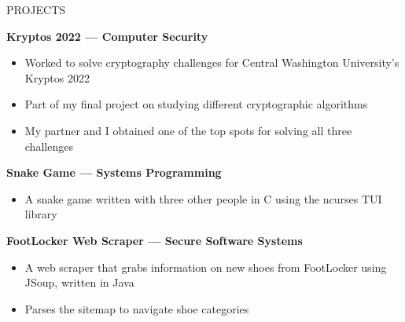 \documentclass{resume}
\begin{document}
\begin{rSection}{PROJECTS}
	\vspace{-1.25em}

	\item \textbf{Kryptos 2022 --- Computer Security} \\
	\vspace{-1.25em}
	\begin{itemize}
		\setlength{\itemsep}{-3pt}
		\item Worked to solve cryptography challenges for Central Washington University's Kryptos 2022
		\item Part of my final project on studying different cryptographic algorithms
		\item My partner and I obtained one of the top spots for solving all three challenges
	\end{itemize}

	\item \textbf{Snake Game --- Systems Programming} \\
	\vspace{-1.25em}
	\begin{itemize}
		\setlength{\itemsep}{-3pt}
		\item A snake game written with three other people in C using the ncurses TUI library
	\end{itemize}

	\item \textbf{FootLocker Web Scraper --- Secure Software Systems} \\
	\vspace{-1.25em}
	\begin{itemize}
		\setlength{\itemsep}{-3pt}
		\item A web scraper that grabs information on new shoes from FootLocker using JSoup, written in Java
		\item Parses the sitemap to navigate shoe categories
	\end{itemize}

\end{rSection}
\end{document}
